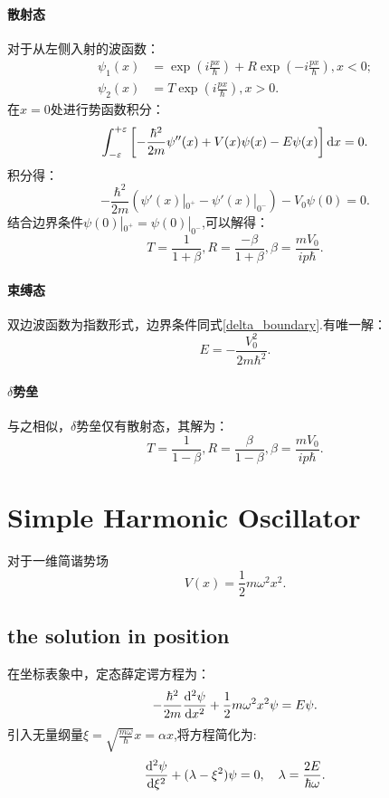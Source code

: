 \paragraph{散射态} 对于从左侧入射的波函数：
\begin{align}
    \psi_1(x)&=\exp\left(i\frac{px}{\hbar}\right)+R\exp\left(-i\frac{px}{\hbar}\right),x<0;\\
    \psi_2(x)&=T\exp\left(i\frac{px}{\hbar}\right),  x>0.
\end{align}
在$x=0$处进行势函数积分：
\begin{equation}
    \int_{-\varepsilon}^{+\varepsilon}\left[-\frac{\hbar^2}{2m}\psi''(x)+V(x)\psi(x)-E\psi(x)\right]\mathrm{d} x=0.
\end{equation}
积分得：
\begin{equation}
    -\frac{\hbar^2}{2m}(\psi'(x)|_{0^+}-\psi'(x)|_{0^-})-V_0\psi(0)=0.
    \label{delta_boundary}
\end{equation}
结合边界条件$\psi(0)|_{0^+}=\psi(0)|_{0^-}$,可以解得：
\begin{equation}
    T=\frac{1}{1+\beta}, R=\frac{-\beta}{1+\beta}, \beta=\frac{mV_0}{ip\hbar}.
\end{equation}

\paragraph{束缚态} 双边波函数为指数形式，边界条件同式\ref{delta_boundary}.有唯一解：
\begin{equation}
    E=-\frac{V_0^2}{2m\hbar^2}.
\end{equation}

\paragraph{$\delta$势垒}与之相似，$\delta$势垒仅有散射态，其解为：
\begin{equation}
    T=\frac{1}{1-\beta}, R=\frac{\beta}{1-\beta}, \beta=\frac{mV_0}{ip\hbar}.
\end{equation}
\section{Simple Harmonic Oscillator}
对于一维简谐势场
\begin{equation}
    V(x)=\frac{1}{2}m\omega^2x^2.
\end{equation}
\subsection{the solution in position}
在坐标表象中，定态薛定谔方程为：
\begin{equation}
    -\frac{\hbar^2}{2m}\frac{\mathrm{d}^2 \psi}{\mathrm{d} x^2}+\frac{1}{2}m\omega^2x^2\psi=E\psi.
\end{equation}
引入无量纲量$\xi=\sqrt{\frac{m\omega}{\hbar}}x=\alpha x$,将方程简化为:
\begin{equation}
    \frac{\mathrm{d}^2 \psi}{\mathrm{d} \xi^2}+(\lambda-\xi^2)\psi=0, \quad \lambda=\frac{2E}{\hbar\omega}.
\end{equation}

